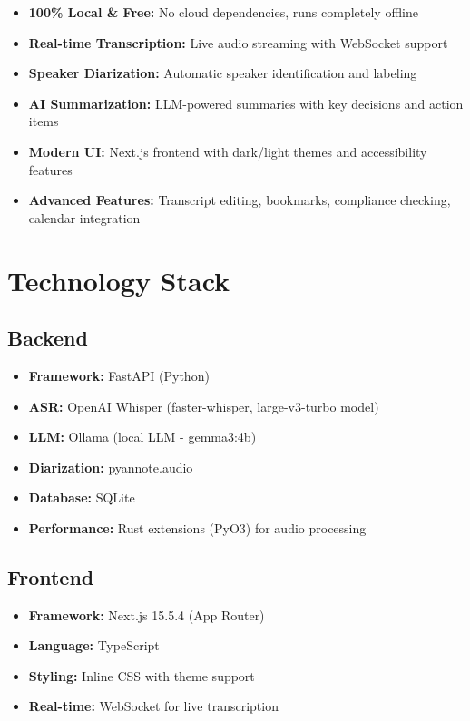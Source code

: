 \documentclass[11pt,a4paper]{article}
\begin{document}
\begin{itemize}[leftmargin=*, itemsep=6pt]
    \item \textbf{100\% Local \& Free:} No cloud dependencies, runs completely offline
    \item \textbf{Real-time Transcription:} Live audio streaming with WebSocket support
    \item \textbf{Speaker Diarization:} Automatic speaker identification and labeling
    \item \textbf{AI Summarization:} LLM-powered summaries with key decisions and action items
    \item \textbf{Modern UI:} Next.js frontend with dark/light themes and accessibility features
    \item \textbf{Advanced Features:} Transcript editing, bookmarks, compliance checking, calendar integration
\end{itemize}

\section*{Technology Stack}

\subsection*{Backend}
\begin{itemize}[leftmargin=*, itemsep=4pt]
    \item \textbf{Framework:} FastAPI (Python)
    \item \textbf{ASR:} OpenAI Whisper (faster-whisper, large-v3-turbo model)
    \item \textbf{LLM:} Ollama (local LLM - gemma3:4b)
    \item \textbf{Diarization:} pyannote.audio
    \item \textbf{Database:} SQLite
    \item \textbf{Performance:} Rust extensions (PyO3) for audio processing
\end{itemize}

\subsection*{Frontend}
\begin{itemize}[leftmargin=*, itemsep=4pt]
    \item \textbf{Framework:} Next.js 15.5.4 (App Router)
    \item \textbf{Language:} TypeScript
    \item \textbf{Styling:} Inline CSS with theme support
    \item \textbf{Real-time:} WebSocket for live transcription
\end{itemize}
\end{document}
